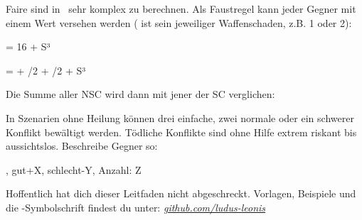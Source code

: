 {		Faire  sind in \nipajin\ sehr komplex zu berechnen. Als Faustregel kann jeder Gegner mit einem Wert versehen werden ( ist sein jeweiliger Waffenschaden, z.B. 1 oder 2):

		\vspace{3pt}
		\centerline{ = 16 + S³}
		\vspace{3pt}
		\centerline{ = \HD + \AD/2 + \RD/2 + S³}
		\vspace{3pt}

		\noindent
		Die Summe aller NSC wird dann mit jener der SC verglichen:


		\noindent
		In Szenarien ohne Heilung können drei einfache, zwei normale oder ein schwerer Konflikt bewältigt werden. Tödliche Konflikte sind ohne Hilfe extrem riskant bis aussichtslos. Beschreibe Gegner so:

		, gut+X, schlecht-Y, Anzahl: Z


		\noindent
		Hoffentlich hat dich dieser Leitfaden nicht abgeschreckt. Vorlagen, Beispiele und die \nipajin-Symbolschrift findest du unter:  \href{https://github.com/ludus-leonis}{\emph{github.com/ludus-leonis}}

}

